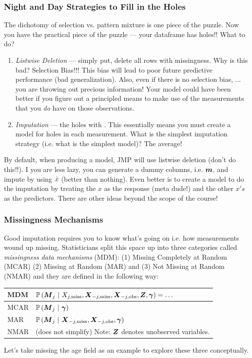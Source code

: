 \documentclass[handout]{beamer}
\begin{document}
\begin{frame}\frametitle{Night and Day Strategies to Fill in the Holes}
\footnotesize
The dichotomy of selection vs. pattern mixture is one piece of the puzzle. Now you have the practical piece of the puzzle --- your dataframe has holes!! What to do?\pause

\begin{enumerate} \footnotesize
\item \emph{Listwise Deletion} \pause --- simply put, delete all rows with missingness. Why is this bad? \pause Selection Bias!!! This bias will lead to poor future predictive performance (bad generalization). Also, even if there is no selection bias, ... \pause you are throwing out precious information! Your model could have been better if you figure out a principled means to make use of the measurements that you \textit{do} have on those observations.
\item \emph{Imputation} \pause ---  the holes with . \pause This essentially means you must create a model for holes in each measurement. What is the simplest imputation strategy (i.e. what is the simplest model)? \pause The average! \pause
\end{enumerate}

By default, when producing a model, JMP will use listwise deletion (don't do this!!). \pause I you are less lazy, you can generate a dummy columns, i.e. $\boldsymbol{m}$, and impute by using $\bar{x}$ (better than nothing). Even better is to create a model to do the imputation by treating the $x$ as the response (meta dude!) and the other $x's$ as the predictors. There are other ideas beyond the scope of the course!

\end{frame}

\begin{frame}\frametitle{Missingness Mechanisms}

Good imputation requires you to know what's going on i.e. how measurements wound up missing. Statisticians split this space up into three categories called \emph{missingness data mechanisms} (MDM): \pause (1) Missing Completely at Random (MCAR) \pause (2) Missing at Random (MAR) and \pause (3) Not Missing at Random (NMAR) and they are defined in the following way:\pause
	
	
\begin{table}[htp]
\centering
\begin{tabular}{l|l}
MDM & $\mathbb{P}\left(\boldsymbol{M}_j~|~X_{j,\text{miss}}, \boldsymbol{X}_{-j,\text{miss}}, \boldsymbol{X}_{-j,\text{obs}}, \boldsymbol{Z}, \boldsymbol{\gamma}\right) = \ldots$ \\ \hline
MCAR & $\mathbb{P}\left(\boldsymbol{M}_j~|~\boldsymbol{\gamma}\right)$ \\ 
MAR & $\mathbb{P}\left(\boldsymbol{M}_j~|~\boldsymbol{X}_{-j,\text{miss}}, \boldsymbol{X}_{-j,\text{obs}}, \boldsymbol{\gamma}\right)$ \\ 
NMAR & (does not simplify) Note: $\boldsymbol{Z}$ denotes unobserved variables.
\end{tabular}
\end{table}\pause


Let's take missing the age field as an example to explore these three conceptually.
\end{frame}
\end{document}
